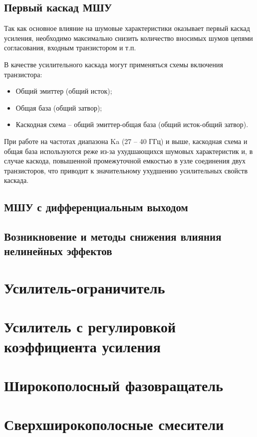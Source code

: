 \subsection{Первый каскад МШУ}
Так как основное влияние на шумовые характеристики оказывает первый каскад усиления, необходимо максимально снизить количество вносимых шумов цепями согласования, входным транзистором и т.п.

В качестве усилительного каскада могут применяться схемы включения транзистора:
\begin{itemize}
	\item Общий эмиттер (общий исток);
	\item Общая база (общий затвор);
	\item Каскодная схема -- общий эмиттер-общая база (общий исток-общий затвор).
\end{itemize}

При работе на частотах диапазона Ka (27 -- 40 ГГц) и выше, каскодная схема и общая база используются реже из-за ухудшающихся шумовых характеристик и, в случае каскода, повышенной промежуточной емкостью в узле соединения двух транзисторов, что приводит к значительному ухудшению усилительных свойств каскада.

\subsection{МШУ с дифференциальным выходом}

\subsection{Возникновение и методы снижения влияния нелинейных эффектов}

\section{Усилитель-ограничитель}

\section{Усилитель с регулировкой коэффициента усиления}

\section{Широкополосный фазовращатель}

\section{Сверхширокополосные смесители}

